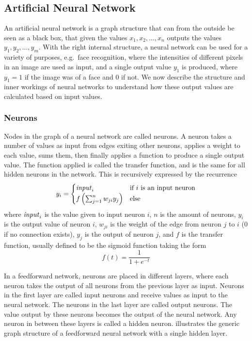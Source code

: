 

\subsection{Artificial Neural Network}
An artificial neural network is a graph structure that can from the outside be seen as a black box, that given the values $x_1, x_2, \dots, x_n$ outputs the values $y_1, y_2, \dots, y_m$. With the right internal structure, a neural network can be used for a variety of purposes, e.g.\ face recognition, where the intensities of different pixels in an image are used as input, and a single output value $y_1$ is produced, where $y_1 = 1$ if the image was of a face and $0$ if not. We now describe the structure and inner workings of neural networks to understand how these output values are calculated based on input values.

\subsubsection{Neurons}
Nodes in the graph of a neural network are called neurons. A neuron takes a number of values as input from edges exiting other neurons, applies a weight to each value, sums them, then finally applies a function to produce a single output value. The function applied is called the transfer function, and is the same for all hidden neurons in the network. This is recursively expressed by the recurrence
\begin{equation}
  y_i =
  \begin{cases}
    \var{input}_i & \text{if } i \text{ is an input neuron} \\
    f\left(\sum_{j=1}^n w_{ji} y_{j} \right) & \text{else} %
  \end{cases}
\end{equation}
where $\mathit{input}_i$ is the value given to input neuron $i$, $n$ is the amount of neurons, $y_i$ is the output value of neuron $i$, $w_{ji}$ is the weight of the edge from neuron $j$ to $i$ ($0$ if no connection exists), $y_j$ is the output of neuron $j$, and $f$ is the transfer function, usually defined to be the sigmoid function taking the form
\begin{equation*}
  f(t) = \frac{1}{1+e^{-t}}
\end{equation*}

In a feedforward network, neurons are placed in different layers, where each neuron takes the output of all neurons from the previous layer as input. Neurons in the first layer are called input neurons and receive values as input to the neural network.  The neurons in the last layer are called output neurons. The value output by these neurons becomes the output of the neural network. Any neuron in between these layers is called a hidden neuron.  illustrates the generic graph structure of a feedforward neural network with a single hidden layer.

